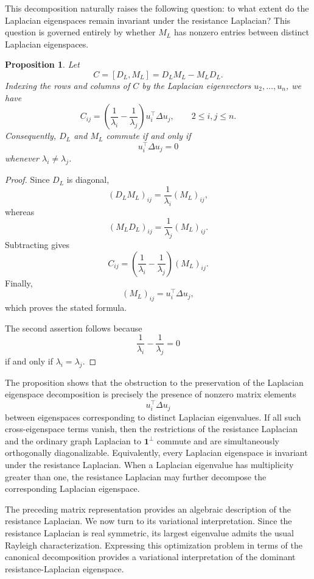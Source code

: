 \documentclass[12pt,a4paper]{amsart}
\newtheorem{proposition}[theorem]{Proposition}
\theoremstyle{remark}
\theoremstyle{definition}
\newcommand{\1}{\mathbf{1}}
\newcommand{\0}{\mathbf{0}}
\begin{document}
This decomposition naturally raises the following question: to what
extent do the Laplacian eigenspaces remain invariant under the
resistance Laplacian? This question is governed entirely by whether
$M_L$ has nonzero entries between distinct Laplacian eigenspaces.

\begin{proposition}\label{prop:commutator}
Let
\[
C=[D_L,M_L]=D_LM_L-M_LD_L.
\]
Indexing the rows and columns of $C$ by the Laplacian eigenvectors
$u_2,\ldots,u_n$, we have
\[
C_{ij}
=
\left(
\frac{1}{\lambda_i}
-
\frac{1}{\lambda_j}
\right)
u_i^\top\Delta u_j,
\qquad
2\leq i,j\leq n.
\]
Consequently, $D_L$ and $M_L$ commute if and only if
\[
u_i^\top\Delta u_j=0
\]
whenever $\lambda_i\neq\lambda_j$.
\end{proposition}

\begin{proof}
Since $D_L$ is diagonal,
\[
(D_LM_L)_{ij}
=
\frac{1}{\lambda_i}(M_L)_{ij},
\]
whereas
\[
(M_LD_L)_{ij}
=
\frac{1}{\lambda_j}(M_L)_{ij}.
\]
Subtracting gives
\[
C_{ij}
=
\left(
\frac{1}{\lambda_i}
-
\frac{1}{\lambda_j}
\right)
(M_L)_{ij}.
\]
Finally,
\[
(M_L)_{ij}
=
u_i^\top\Delta u_j,
\]
which proves the stated formula.

The second assertion follows because
\[
\frac{1}{\lambda_i}-\frac{1}{\lambda_j}=0
\]
if and only if $\lambda_i=\lambda_j$.
\end{proof}

The proposition shows that the obstruction to the preservation of the
Laplacian eigenspace decomposition is precisely the presence of
nonzero matrix elements
\[
u_i^\top\Delta u_j
\]
between eigenspaces corresponding to distinct Laplacian eigenvalues.
If all such cross-eigenspace terms vanish, then the restrictions of
the resistance Laplacian and the ordinary graph Laplacian to
$\mathbf{1}^{\perp}$ commute and are simultaneously orthogonally
diagonalizable. Equivalently, every Laplacian eigenspace is invariant
under the resistance Laplacian. When a Laplacian eigenvalue has
multiplicity greater than one, the resistance Laplacian may further
decompose the corresponding Laplacian eigenspace.

The preceding matrix representation provides an algebraic description
of the resistance Laplacian. We now turn to its variational
interpretation. Since the resistance Laplacian is real symmetric, its
largest eigenvalue admits the usual Rayleigh characterization.
Expressing this optimization problem in terms of the canonical
decomposition provides a variational interpretation of the dominant
resistance-Laplacian eigenspace.
\end{document}
